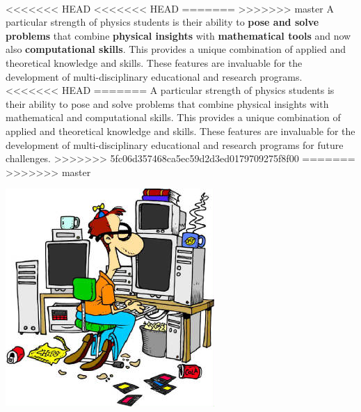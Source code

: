 \documentclass[%
<<<<<<< HEAD
<<<<<<< HEAD
oneside,                 %
final,                   %
=======
twoside,                 %
final,                   %
>>>>>>> 5fc06d357468ca5ec59d2d3ed0179709275f8f00
=======
oneside,                 %
final,                   %
>>>>>>> master
10pt]{article}
\begin{document}
\paragraph{}
<<<<<<< HEAD
<<<<<<< HEAD
=======
>>>>>>> master
A particular strength of physics students is their ability to \textbf{pose and
solve problems} that combine \textbf{physical insights} with \textbf{mathematical tools}
and now also \textbf{computational skills}. This provides a unique combination
of applied and theoretical knowledge and skills. These features are invaluable
for the development of multi-disciplinary educational and research programs.
<<<<<<< HEAD
=======
A particular strength of physics students is their ability to pose and
solve problems that combine physical insights with mathematical
and  computational skills. This provides a unique combination
of applied and theoretical knowledge and skills. These features are invaluable 
for the development of multi-disciplinary educational and research programs for future challenges.
>>>>>>> 5fc06d357468ca5ec59d2d3ed0179709275f8f00
=======
>>>>>>> master





\centerline{\includegraphics[width=1.0\linewidth]{fig-future/computer_nerd2.jpg}}
\end{document}

